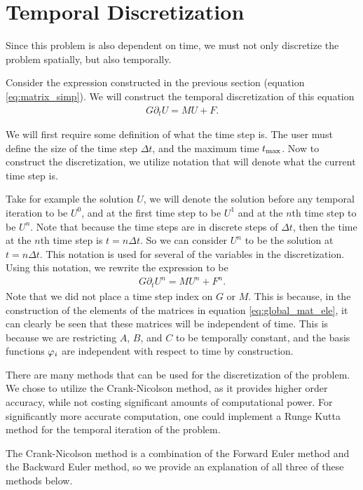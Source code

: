 \documentclass[../fem.tex]{subfile}
\begin{document}
\section{Temporal Discretization}%
\label{sec:temporal_discretization}

Since this problem is also dependent on time, we must not only discretize the
problem spatially, but also temporally.

Consider the expression constructed in the previous section (equation
\ref{eq:matrix_simp}). We will construct the temporal discretization of this
equation
\begin{align*}
   G\partial_t U=MU+F.
\end{align*}

We will first require some definition of what the time step is. The user must
define the size of the time step $\Delta t$, and the maximum time $t_{\text{max}}$. Now to
construct the discretization, we utilize notation that will denote what the
current time step is.

Take for example the solution $U$, we will denote the solution before any
temporal iteration to be $U^0$, and at the first time step to be $U^1$ and at
the $n$th time step to be $U^n$. Note that because the time steps are in
discrete steps of $\Delta t$, then the time at the $n$th time step is
$t=n\Delta t$. So we can consider $U^n$ to be the solution at $t=n\Delta t$.
This notation is used for several of the variables in the discretization. Using
this notation, we rewrite the expression to be
\begin{align}\label{eq:time_disc}
   G\partial_t U^n=MU^n+F^n.
\end{align}
Note that we did not place a time step index on $G$ or $M$. This is because, in
the construction of the elements of the matrices in equation
\ref{eq:global_mat_ele}, it can clearly be seen that these matrices will be
independent of time. This is because we are restricting $A$, $B$, and $C$ to be
temporally constant, and the basis functions $\varphi_i$ are independent with
respect to time by construction.

There are many methods that can be used for the discretization of the problem.
We chose to utilize the Crank-Nicolson method, as it provides higher order
accuracy, while not costing significant amounts of computational power. For
significantly more accurate computation, one could implement a Runge Kutta
method for the temporal iteration of the problem.

The Crank-Nicolson method is a combination of the Forward Euler method and the
Backward Euler method, so we provide an explanation of all three of these
methods below.
\end{document}
